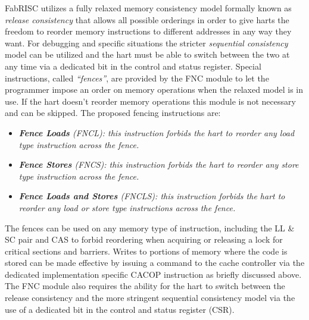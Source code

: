         \vspace{10pt}

        FabRISC utilizes a fully relaxed memory consistency model formally known as \textit{release consistency} that allows all possible orderings in order to give harts the freedom to reorder memory instructions to different addresses in any way they want. For debugging and specific situations the stricter \textit{sequential consistency} model can be utilized and the hart must be able to switch between the two at any time via a dedicated bit in the control and status register. Special instructions, called \textit{``fences''}, are provided by the FNC module to let the programmer impose an order on memory operations when the relaxed model is in use. If the hart doesn't reorder memory operations this module is not necessary and can be skipped. The proposed fencing instructions are:

        \begin{itemize}

            \item \textit{\textbf{Fence Loads} (FNCL): this instruction forbids the hart to reorder any load type instruction across the fence.}

            \item \textit{\textbf{Fence Stores} (FNCS): this instruction forbids the hart to reorder any store type instruction across the fence.}

            \item \textit{\textbf{Fence Loads and Stores} (FNCLS): this instruction forbids the hart to reorder any load or store type instructions across the fence.}

        \end{itemize}

        The fences can be used on any memory type of instruction, including the LL \& SC pair and CAS to forbid reordering when acquiring or releasing a lock for critical sections and barriers. Writes to portions of memory where the code is stored can be made effective by issuing a command to the cache controller via the dedicated implementation specific CACOP instruction as briefly discussed above. The FNC module also requires the ability for the hart to switch between the release consistency and the more stringent sequential consistency model via the use of a dedicated bit in the control and status register (CSR).

